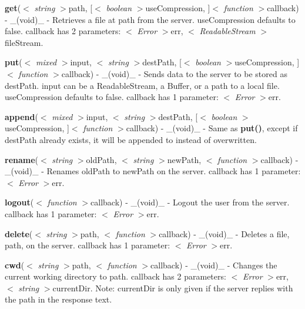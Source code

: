 \begin{DoxyItemize}
\item {\bfseries get}($<$ {\itshape string} $>$path, \mbox{[}$<$ {\itshape boolean} $>$use\+Compression, \mbox{]}$<$ {\itshape function} $>$callback) -\/ \+\_\+(void)\+\_\+ -\/ Retrieves a file at {\ttfamily path} from the server. {\ttfamily use\+Compression} defaults to false. {\ttfamily callback} has 2 parameters\+: $<$ {\itshape Error} $>$err, $<$ {\itshape Readable\+Stream} $>$file\+Stream.
\item {\bfseries put}($<$ {\itshape mixed} $>$input, $<$ {\itshape string} $>$dest\+Path, \mbox{[}$<$ {\itshape boolean} $>$use\+Compression, \mbox{]}$<$ {\itshape function} $>$callback) -\/ \+\_\+(void)\+\_\+ -\/ Sends data to the server to be stored as {\ttfamily dest\+Path}. {\ttfamily input} can be a Readable\+Stream, a Buffer, or a path to a local file. {\ttfamily use\+Compression} defaults to false. {\ttfamily callback} has 1 parameter\+: $<$ {\itshape Error} $>$err.
\item {\bfseries append}($<$ {\itshape mixed} $>$input, $<$ {\itshape string} $>$dest\+Path, \mbox{[}$<$ {\itshape boolean} $>$use\+Compression, \mbox{]}$<$ {\itshape function} $>$callback) -\/ \+\_\+(void)\+\_\+ -\/ Same as {\bfseries put()}, except if {\ttfamily dest\+Path} already exists, it will be appended to instead of overwritten.
\item {\bfseries rename}($<$ {\itshape string} $>$old\+Path, $<$ {\itshape string} $>$new\+Path, $<$ {\itshape function} $>$callback) -\/ \+\_\+(void)\+\_\+ -\/ Renames {\ttfamily old\+Path} to {\ttfamily new\+Path} on the server. {\ttfamily callback} has 1 parameter\+: $<$ {\itshape Error} $>$err.
\item {\bfseries logout}($<$ {\itshape function} $>$callback) -\/ \+\_\+(void)\+\_\+ -\/ Logout the user from the server. {\ttfamily callback} has 1 parameter\+: $<$ {\itshape Error} $>$err.
\item {\bfseries delete}($<$ {\itshape string} $>$path, $<$ {\itshape function} $>$callback) -\/ \+\_\+(void)\+\_\+ -\/ Deletes a file, {\ttfamily path}, on the server. {\ttfamily callback} has 1 parameter\+: $<$ {\itshape Error} $>$err.
\item {\bfseries cwd}($<$ {\itshape string} $>$path, $<$ {\itshape function} $>$callback) -\/ \+\_\+(void)\+\_\+ -\/ Changes the current working directory to {\ttfamily path}. {\ttfamily callback} has 2 parameters\+: $<$ {\itshape Error} $>$err, $<$ {\itshape string} $>$current\+Dir. Note\+: {\ttfamily current\+Dir} is only given if the server replies with the path in the response text.

\end{DoxyItemize}
